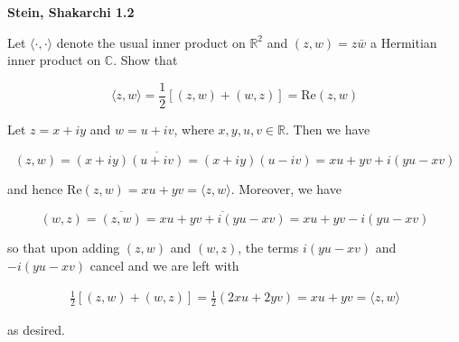 \textbf{Stein, Shakarchi 1.2}

Let $\langle \cdot, \cdot \rangle$ denote the usual inner product on $\mathbb{R}^2$ and $(z, w) = z \bar{w}$ a Hermitian 
inner product on $\mathbb{C}$. Show that 

$$
\langle z, w \rangle = \frac{1}{2} \left[ (z, w) + (w, z) \right] = \text{Re}(z, w)
$$

\begin{solution}
    Let $z = x + iy$ and $w = u + iv$, where $x, y, u, v \in \mathbb{R}$. Then we have

    $$
    (z, w) = (x + iy)\overline{(u + iv)} = (x + iy)(u - iv) = xu + yv + i(yu - xv)
    $$

    and hence $\text{Re}(z, w) = xu + yv = \langle z, w \rangle$. Moreover, we have

    $$
    (w, z) = \overline{(z, w)} = \overline{xu + yv + i(yu - xv)} = xu + yv - i(yu - xv) 
    $$

    so that upon adding $(z, w)$ and $(w, z)$, the terms $i(yu - xv)$ and $-i(yu - xv)$ cancel and we are left with

    \begin{align*}
        \frac{1}{2} \left[ (z, w) + (w, z) \right] = \frac{1}{2} (2xu + 2yv) = xu + yv = \langle z, w \rangle
    \end{align*}

    as desired.
    \ \\
\end{solution}
